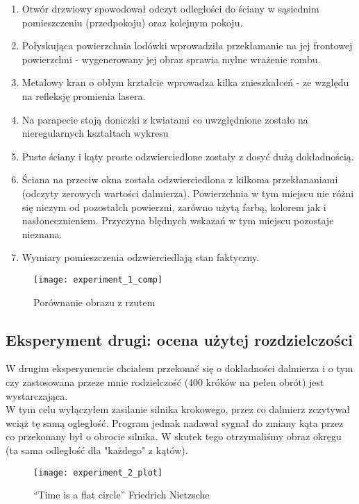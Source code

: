\begin{enumerate}
    \item Otwór drzwiowy spowodował odczyt odległości do ściany w sąsiednim pomieszczeniu (przedpokoju) oraz kolejnym pokoju.
    \item Połyskująca powierzchnia lodówki wprowadziła przekłamanie na jej frontowej powierzchni - wygenerowany jej obraz sprawia mylne wrażenie rombu. 
    \item Metalowy kran o obłym krztałcie wprowadza kilka znieszkałceń - ze względu na refleksję promienia lasera.
    \item Na parapecie stoją doniczki z kwiatami co uwzględnione zostało na nieregularnych kształtach wykresu
    \item Puste ściany i kąty proste odzwierciedlone zostały z dosyć dużą dokładnością.
    \item Ściana na przeciw okna została odzwierciedlona z kilkoma przekłananiami (odczyty zerowych wartości dalmierza). Powierzchnia w tym miejscu nie różni się niczym od pozostałch powierzni, zarówno użytą farbą, kolorem jak i nasłonecznieniem. Przyczyna błędnych wskazań w tym miejscu pozostaje nieznana.
    \item Wymiary pomieszczenia odzwierciedlają stan faktyczny.
\end{enumerate}
\begin{figure}[h]
    \centering
    \texttt{[image: experiment\_1\_comp]}
    \caption{Porównanie obrazu z rzutem}
    \label{fig:experiment_1_comp}
\end{figure}

\newpage
\subsection {Eksperyment drugi: ocena użytej rozdzielczości}

W drugim eksperymencie chciałem przekonać się o dokładności dalmierza i o tym czy zastosowana przeze mnie rodzielczość (400 króków na pełen obrót) jest wystarczająca.\\

W tym celu wyłączyłem zasilanie silnika krokowego, przez co dalmierz zczytywał wciąż tę samą ogległość. Program jednak nadawał sygnał do zmiany kąta przez co przekonany był o obrocie silnika. W skutek tego otrzymaliśmy obraz okręgu (ta sama odległość dla "każdego" z kątów).

\begin{figure}[h]
    \centering
    \texttt{[image: experiment\_2\_plot]}
    \caption{“Time is a flat circle” Friedrich Nietzsche}
    \label{fig:experiment_2_plot}
\end{figure}

